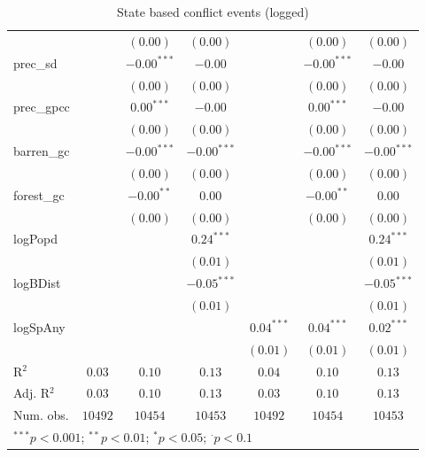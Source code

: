 \begin{sidewaystable}
\begin{center}
{\begin{tabular}{l c c c c c c}
                &               & $(0.00)$      & $(0.00)$      &               & $(0.00)$      & $(0.00)$      \\
prec\_sd        &               & $-0.00^{***}$ & $-0.00$       &               & $-0.00^{***}$ & $-0.00$       \\
                &               & $(0.00)$      & $(0.00)$      &               & $(0.00)$      & $(0.00)$      \\
prec\_gpcc      &               & $0.00^{***}$  & $-0.00$       &               & $0.00^{***}$  & $-0.00$       \\
                &               & $(0.00)$      & $(0.00)$      &               & $(0.00)$      & $(0.00)$      \\
barren\_gc      &               & $-0.00^{***}$ & $-0.00^{***}$ &               & $-0.00^{***}$ & $-0.00^{***}$ \\
                &               & $(0.00)$      & $(0.00)$      &               & $(0.00)$      & $(0.00)$      \\
forest\_gc      &               & $-0.00^{**}$  & $0.00$        &               & $-0.00^{**}$  & $0.00$        \\
                &               & $(0.00)$      & $(0.00)$      &               & $(0.00)$      & $(0.00)$      \\
logPopd         &               &               & $0.24^{***}$  &               &               & $0.24^{***}$  \\
                &               &               & $(0.01)$      &               &               & $(0.01)$      \\
logBDist        &               &               & $-0.05^{***}$ &               &               & $-0.05^{***}$ \\
                &               &               & $(0.01)$      &               &               & $(0.01)$      \\
logSpAny        &               &               &               & $0.04^{***}$  & $0.04^{***}$  & $0.02^{***}$  \\
                &               &               &               & $(0.01)$      & $(0.01)$      & $(0.01)$      \\
\hline
R$^2$           & $0.03$        & $0.10$        & $0.13$        & $0.04$        & $0.10$        & $0.13$        \\
Adj. R$^2$      & $0.03$        & $0.10$        & $0.13$        & $0.03$        & $0.10$        & $0.13$        \\
Num. obs.       & $10492$       & $10454$       & $10453$       & $10492$       & $10454$       & $10453$       \\
\hline
\multicolumn{7}{l}{\scriptsize{$^{***}p<0.001$; $^{**}p<0.01$; $^{*}p<0.05$; $^{\cdot}p<0.1$}}
\end{tabular}
}
\caption{State based conflict events (logged)}
\label{logState_based}
\end{center}
\end{sidewaystable}
